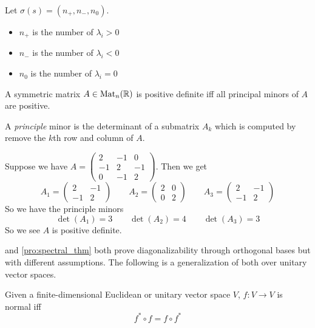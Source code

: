 \begin{corollary}
   Let \(\sigma(s) = (n_+, n_-, n_0)\).
   \begin{itemize}
      \item \(n_+\) is the number of \(\lambda_i > 0\)
      \item \(n_-\) is the number of \(\lambda_i < 0\)
      \item \(n_0\) is the number of \(\lambda_i = 0\)
   \end{itemize}
\end{corollary}

\begin{proposition}
   A symmetric matrix \(A \in \operatorname{Mat}_n(\mathbb{R})\) is positive definite iff all principal minors of \(A\) are positive.
\end{proposition}
\begin{remark}
   A \emph{principle} minor is the determinant of a submatrix \(A_k\) which is computed by remove the \(k\)th row and column of \(A\).
\end{remark}
\begin{example}
   Suppose we have \(A = \begin{pmatrix}2&-1&0\\-1&2&-1\\0&-1&2\end{pmatrix}\).
   Then we get
   \[A_1 = \begin{pmatrix}2&-1\\-1&2\end{pmatrix} \qquad A_2 = \begin{pmatrix}2&0\\0&2\end{pmatrix} \qquad A_3 = \begin{pmatrix}2&-1\\-1&2\end{pmatrix}\]
   So we have the principle minors
   \[\det(A_1) = 3 \qquad \det(A_2) = 4 \qquad \det(A_3) = 3\]
   So we see \(A\) is positive definite.
\end{example}

 and \cref{pro:spectral_thm} both prove diagonalizability through orthogonal bases but with different assumptions.
The following is a generalization of both over unitary vector spaces.
\begin{definition}
   Given a finite-dimensional Euclidean or unitary vector space \(V\), \(f: V \to V\) is normal iff
   \[f^\ast \circ f = f \circ f^\ast\]
\end{definition}

